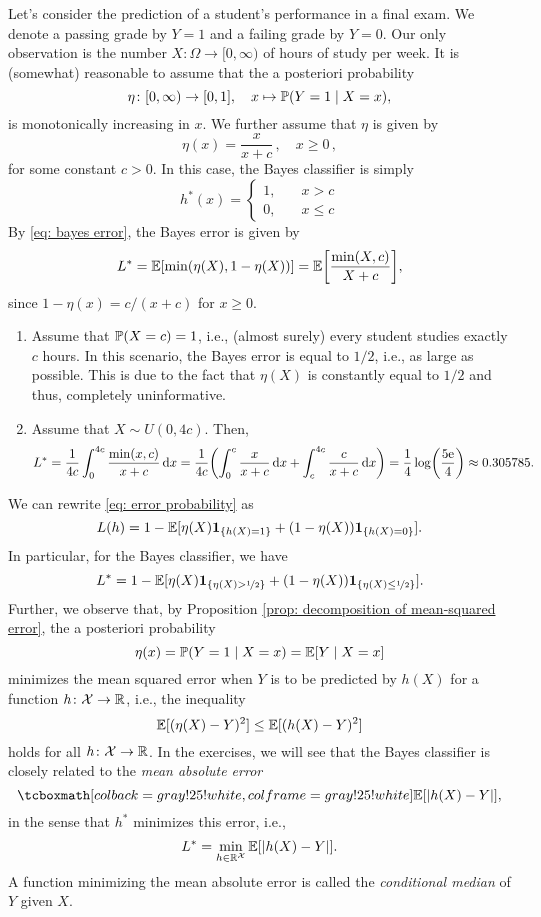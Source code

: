 \begin{example}
Let's consider the prediction of a student's performance in a final exam. We denote a passing grade by $Y = 1$ and a failing grade by $Y = 0$. Our only observation is the number $X \colon \Omega \to [0, \infty)$ of hours of study per week. It is (somewhat) reasonable to assume that the a posteriori probability
\[
    \eta \colon [0, \infty) \to [0, 1], \quad x \mapsto \P(Y = 1 \given X = x),
\]
is monotonically increasing in $x$. We further assume that $\eta$ is given by
\[
    \eta(x) = \frac{x}{x + c} \, , \quad x \geq 0 \, ,
\]
for some constant $c > 0$. In this case, the Bayes classifier is simply
\[
    h^*(x) = \begin{cases}
        1, \quad & x > c \\
        0, \quad & x \leq c
    \end{cases}
\]
By \eqref{eq: bayes error}, the Bayes error is given by
\[
    L^* = \Exp[\min(\eta(X), 1 - \eta(X))] = \Exp\left[\frac{\min(X, c)}{X + c}\right],
\]
since $1 - \eta(x) = c / (x+c)$ for $x \geq 0$.

\begin{enumerate}
    \item Assume that $\P(X = c) = 1$, i.e., (almost surely) every student studies exactly $c$ hours. In this scenario, the Bayes error is equal to $1/2$, i.e., as large as possible. This is due to the fact that $\eta(X)$ is constantly equal to $1/2$ and thus, completely uninformative.
    
    \item Assume that $X \sim U(0, 4c)$. Then,
    \[
        L^* = \frac{1}{4c} \int_0^{4c} \frac{\min(x, c)}{x + c} \dx = \frac{1}{4c} \left( \int_0^c \frac{x}{x + c} \dx + \int_c^{4c} \frac{c}{x + c} \dx \right) = \frac{1}{4} \log(\frac{5\e}{4}) \approx 0.305785.
    \]
\end{enumerate}
\end{example}

\begin{remark}
We can rewrite \eqref{eq: error probability} as
\[
    L(h) = 1 - \Exp[\eta(X) \indSet{h(X) = 1} + (1 - \eta(X)) \indSet{h(X) = 0}].
\]
In particular, for the Bayes classifier, we have
\[
    L^* = 1 - \Exp[\eta(X) \indSet{\eta(X) > \nicefrac{1}{2}} + (1 - \eta(X)) \indSet{\eta(X) \leq \nicefrac{1}{2}}].
\]
Further, we observe that, by Proposition \ref{prop: decomposition of mean-squared error}, the a posteriori probability
\[
    \eta(x) = \P(Y = 1 \given X = x) = \Exp[Y \given X = x]
\]
minimizes the mean squared error when $Y$ is to be predicted by $h(X)$ for a function $h \colon \mathcal{X} \to \R$, i.e., the inequality
\[
    \Exp[(\eta(X) - Y)^2] \leq \Exp[(h(X) - Y)^2]
\]
holds for all $h \colon \mathcal{X} \to \R$. In the exercises, we will see that the Bayes classifier is closely related to the \emph{mean absolute error}
\[
    \highlightMath{
        \Exp[\abs{h(X) - Y}],
    }
\]
in the sense that $h^*$ minimizes this error, i.e.,
\[
    L^* = \min_{h \in \R^{\mathcal{X}}} \Exp[\abs{h(X) - Y}].
\]
A function minimizing the mean absolute error is called the \emph{conditional median} of $Y$ given $X$.
\end{remark}

